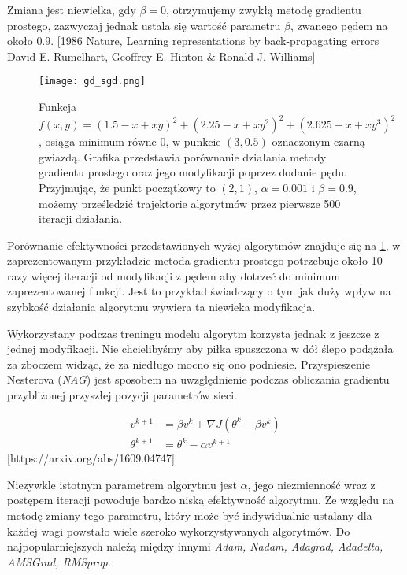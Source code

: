 \documentclass[]{article}
\theoremstyle{definition}
\begin{document}
Zmiana jest niewielka, gdy $\beta = 0$, otrzymujemy zwykłą metodę gradientu prostego, zazwyczaj jednak ustala się wartość parametru $\beta$, zwanego pędem na około $0.9$. [1986 Nature, Learning representations by back-propagating errors
David E. Rumelhart, Geoffrey E. Hinton \& Ronald J. Williams] 

\begin{figure}[h	]
	\centering
	\texttt{[image: gd\_sgd.png]}
	\caption{Funkcja  $f(x,y) =(1.5 - x + xy)^2 + (2.25 - x + xy^2)^2 + (2.625 - x + xy^3)^2$, osiąga minimum równe 0, w punkcie $(3,0.5)$ oznaczonym  czarną gwiazdą. Grafika przedstawia porównanie działania metody gradientu prostego oraz jego modyfikacji poprzez dodanie pędu. Przyjmując, że punkt początkowy to $(2,1)$, $\alpha = 0.001$ i $\beta = 0.9$, możemy prześledzić trajektorie algorytmów przez pierwsze 500 iteracji działania.} 
	\label{fig:gd_sgd}
\end{figure}

Porównanie efektywności przedstawionych wyżej algorytmów znajduje się na \figurename{} \ref{fig:gd_sgd}, w zaprezentowanym przykładzie metoda gradientu prostego potrzebuje około 10 razy więcej iteracji od modyfikacji z pędem aby dotrzeć do minimum zaprezentowanej funkcji. Jest to przykład świadczący o tym jak duży wpływ na szybkość działania algorytmu wywiera ta niewieka modyfikacja. 


Wykorzystany podczas treningu modelu algorytm korzysta jednak z jeszcze z jednej modyfikacji. Nie chcielibyśmy aby piłka spuszczona w dół ślepo podążała za zboczem widząc, że za niedługo mocno się ono podniesie. Przyspieszenie Nesterova (\textit{NAG}) jest sposobem na uwzględnienie podczas obliczania gradientu przybliżonej przyszłej pozycji parametrów sieci.	

\begin{align} 
v^{k+1} &=  \beta v^{k}+ \nabla J(\theta^{k} - \beta v^{k}) \\[0.4em]
\theta^{k+1} &=  \theta^{k }- \alpha v^{k+1}
\end{align}
[https://arxiv.org/abs/1609.04747]


Niezywkle istotnym parametrem algorytmu jest $\alpha$, jego niezmienność wraz z postępem iteracji powoduje bardzo niską efektywność algorytmu. Ze względu na metodę zmiany tego parametru, który może być indywidualnie ustalany dla każdej wagi powstało wiele szeroko wykorzystywanych algorytmów. Do najpopularniejszych należą między innymi \textit{Adam, Nadam, Adagrad, Adadelta, AMSGrad, RMSprop}. 
\end{document}
